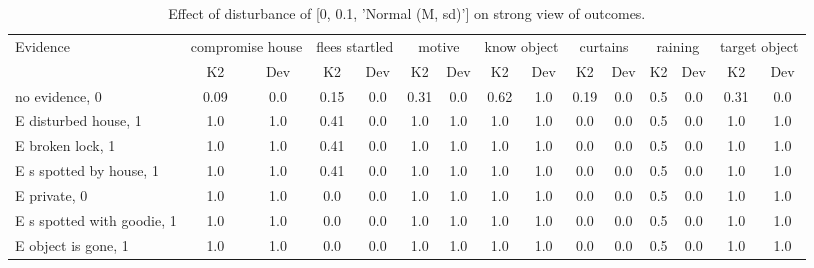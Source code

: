 \begin{table}\begin{tabular}{l|cc|cc|cc|cc|cc|cc|cc}\toprule\multirow{2}{*}{Evidence} & \multicolumn{2}{c}{compromise house}& \multicolumn{2}{c}{flees startled}& \multicolumn{2}{c}{motive}& \multicolumn{2}{c}{know object}& \multicolumn{2}{c}{curtains}& \multicolumn{2}{c}{raining}& \multicolumn{2}{c}{target object}\\& {K2} & {Dev}& {K2} & {Dev}& {K2} & {Dev}& {K2} & {Dev}& {K2} & {Dev}& {K2} & {Dev}& {K2} & {Dev}\\\midrule
no evidence, 0 & \cellcolor{Bittersweet}0.09&\cellcolor{Bittersweet}0.0&\cellcolor{Bittersweet}0.15&\cellcolor{Bittersweet}0.0&\cellcolor{Bittersweet}0.31&\cellcolor{Bittersweet}0.0&0.62&1.0&\cellcolor{Bittersweet}0.19&\cellcolor{Bittersweet}0.0&0.5&0.0&\cellcolor{Bittersweet}0.31&\cellcolor{Bittersweet}0.0\\E disturbed house, 1 & \cellcolor{Bittersweet}1.0&\cellcolor{Bittersweet}1.0&0.41&0.0&\cellcolor{Bittersweet}1.0&\cellcolor{Bittersweet}1.0&\cellcolor{Bittersweet}1.0&\cellcolor{Bittersweet}1.0&\cellcolor{Bittersweet}0.0&\cellcolor{Bittersweet}0.0&0.5&0.0&\cellcolor{Bittersweet}1.0&\cellcolor{Bittersweet}1.0\\E broken lock, 1 & \cellcolor{Bittersweet}1.0&\cellcolor{Bittersweet}1.0&0.41&0.0&\cellcolor{Bittersweet}1.0&\cellcolor{Bittersweet}1.0&\cellcolor{Bittersweet}1.0&\cellcolor{Bittersweet}1.0&\cellcolor{Bittersweet}0.0&\cellcolor{Bittersweet}0.0&0.5&0.0&\cellcolor{Bittersweet}1.0&\cellcolor{Bittersweet}1.0\\E s spotted by house, 1 & \cellcolor{Bittersweet}1.0&\cellcolor{Bittersweet}1.0&0.41&0.0&\cellcolor{Bittersweet}1.0&\cellcolor{Bittersweet}1.0&\cellcolor{Bittersweet}1.0&\cellcolor{Bittersweet}1.0&\cellcolor{Bittersweet}0.0&\cellcolor{Bittersweet}0.0&0.5&0.0&\cellcolor{Bittersweet}1.0&\cellcolor{Bittersweet}1.0\\E private, 0 & \cellcolor{Bittersweet}1.0&\cellcolor{Bittersweet}1.0&\cellcolor{Bittersweet}0.0&\cellcolor{Bittersweet}0.0&\cellcolor{Bittersweet}1.0&\cellcolor{Bittersweet}1.0&\cellcolor{Bittersweet}1.0&\cellcolor{Bittersweet}1.0&\cellcolor{Bittersweet}0.0&\cellcolor{Bittersweet}0.0&0.5&0.0&\cellcolor{Bittersweet}1.0&\cellcolor{Bittersweet}1.0\\E s spotted with goodie, 1 & \cellcolor{Bittersweet}1.0&\cellcolor{Bittersweet}1.0&\cellcolor{Bittersweet}0.0&\cellcolor{Bittersweet}0.0&\cellcolor{Bittersweet}1.0&\cellcolor{Bittersweet}1.0&\cellcolor{Bittersweet}1.0&\cellcolor{Bittersweet}1.0&\cellcolor{Bittersweet}0.0&\cellcolor{Bittersweet}0.0&0.5&0.0&\cellcolor{Bittersweet}1.0&\cellcolor{Bittersweet}1.0\\E object is gone, 1 & \cellcolor{Bittersweet}1.0&\cellcolor{Bittersweet}1.0&\cellcolor{Bittersweet}0.0&\cellcolor{Bittersweet}0.0&\cellcolor{Bittersweet}1.0&\cellcolor{Bittersweet}1.0&\cellcolor{Bittersweet}1.0&\cellcolor{Bittersweet}1.0&\cellcolor{Bittersweet}0.0&\cellcolor{Bittersweet}0.0&0.5&0.0&\cellcolor{Bittersweet}1.0&\cellcolor{Bittersweet}1.0\\\bottomrule\end{tabular}\caption{Effect of disturbance of [0, 0.1, 'Normal (M, sd)'] on strong view of outcomes.}\end{table}